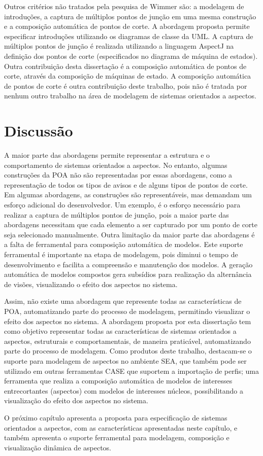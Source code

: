 Outros critérios não tratados pela pesquisa de Wimmer \cite{wimmer:2011:SUA:1978802.1978807} são: a modelagem de introduções, a captura de
múltiplos pontos de junção em uma mesma construção e a composição automática de pontos de corte. A abordagem proposta permite especificar introduções
utilizando os diagramas de classe da UML. A captura de múltiplos pontos de junção é realizada utilizando a linguagem AspectJ na definição
dos pontos de corte (especificados no diagrama de máquina de estados). Outra contribuição desta dissertação é a composição automática de
pontos de corte, através da composição de máquinas de estado. A composição automática de pontos de corte é outra contribuição deste
trabalho, pois não é tratada por nenhum outro trabalho na área de modelagem de sistemas orientados a aspectos.

\section{Discussão}

A maior parte das abordagens permite representar a estrutura e o comportamento de sistemas orientados a aspectos. No entanto, algumas construções da POA não são representadas por essas abordagens, como a representação de todos os tipos de avisos e de alguns tipos de pontos de corte.
Em algumas abordagens, as construções são representáveis, mas demandam um esforço adicional do desenvolvedor. Um exemplo, é o esforço necessário 
para realizar a captura de múltiplos pontos de junção, pois a maior parte das abordagens necessitam que cada elemento a ser capturado por um ponto de
corte seja selecionado manualmente. Outra limitação da maior parte das abordagens é a falta de ferramental para composição automática de modelos. 
Este suporte ferramental é importante na etapa de modelagem, pois diminui o tempo de desenvolvimento e facilita a compreensão e manutenção dos
modelos. A geração automática de modelos compostos gera subsídios para realização da alternância de visões, visualizando o efeito dos aspectos no sistema.

Assim, não existe uma abordagem que represente todas as características de POA, automatizando parte do processo de modelagem, permitindo visualizar o
efeito dos aspectos no sistema. A abordagem proposta por esta dissertação tem como objetivo representar todas as características de sistemas
orientados a aspectos, estruturais e comportamentais, de maneira praticável, automatizando parte do processo de modelagem. Como produtos deste trabalho, destacam-se o
suporte para modelagem de aspectos no ambiente SEA, que também pode ser utilizado em outras ferramentas CASE que suportem a importação de
perfis; uma ferramenta que realiza a composição automática de modelos de interesses entrecortantes (aspectos) com modelos de interesses
núcleos, possibilitando a visualização do efeito dos aspectos no sistema.

O próximo capítulo apresenta a proposta para especificação de sistemas orientados a aspectos, com as características apresentadas neste capítulo, e
também apresenta o suporte ferramental para modelagem, composição e visualização dinâmica de aspectos.
